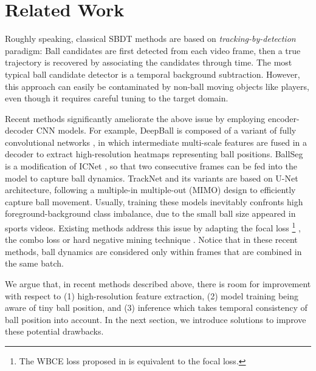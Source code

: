 \documentclass{bmvc2k}
\begin{document}
\section{Related Work}
\label{sec:related}
Roughly speaking, classical SBDT methods
\cite{lepetit+2003cvpr,yu+2003acmmm,yu+2003icme,yu+2003icme2,tong+2004icpr,yu+2004icip,zaveri+2004icme,desai+2005prmi,kittler+2005ia,liang+2005pcm,yan+2005bmvc,abed+2006acivs,chen+2006cesa,ren+2006eccvw,shimawaki+2006icpr,yu+2006tmm,chen+2007tst,chen+2007icassp,yu+2007icme,yu+2007avc,yu+2007vcip,ariki+2008icme,huang+2008icpr,pallavi+2008jvcir,yan+2008tpami,zhu+2008civr,beetz+2009ijcss,zhu+2009tmm,kim+2009cgiv,miura+2009cviu,wong+2010ics,teachabarikiti+2010icca,chakraborty+2011sic,chakraborty+2012icspcc,chakraborty+2013indicon,chakraborty+2013jo,zhou+2013icassp,yan+2014cvs,archana+2015pcs,lyu+2015icia,zhou+2015tmm,lyu+2017ijsr}
are based on {\it tracking-by-detection} paradigm:
Ball candidates are first detected from each video frame, then a true trajectory is recovered by associating the candidates through time.
The most typical ball candidate detector is a temporal background subtraction.
However, this approach can easily be contaminated by non-ball moving objects like players, even though it requires careful tuning to the target domain.
\par
Recent methods \cite{reno+2018cvprw,kamble+2018oer,voeikov+2020cvprw,komorowski+2020visapp,komorowski+2019visapp,komorowski+2019mva,zandycke+2019mmsports,wu+2020iet,ghasemzadeh+2021bmvc,huang+2019avss,sun+2020icpai,liu+2022cvprw} significantly ameliorate the above issue by employing encoder-decoder CNN models.
For example, DeepBall \cite{komorowski+2019visapp,komorowski+2019mva} is composed of a variant of fully convolutional networks \cite{liu+2016eccv}, in which intermediate multi-scale features are fused in a decoder to extract high-resolution heatmaps representing ball positions.
BallSeg \cite{zandycke+2019mmsports} is a modification of ICNet \cite{zhao+2018eccv}, so that two consecutive frames can be fed into the model to capture ball dynamics.
TrackNet and its variants \cite{huang+2019avss,sun+2020icpai,liu+2022cvprw} are based on U-Net \cite{ronneberger+2015miccai} architecture, following a multiple-in multiple-out (MIMO) design to efficiently capture ball movement.
Usually, training these models inevitably confronts high foreground-background class imbalance, due to the small ball size appeared in sports videos.
Existing methods address this issue by adapting the focal loss \footnote{The WBCE loss proposed in \cite{sun+2020icpai} is equivalent to the focal loss.} \cite{lin+2017iccv},
the combo loss \cite{taghanaki+cmig} or hard negative mining technique \cite{liu+2016eccv}.
Notice that in these recent methods, ball dynamics are considered only within frames that are combined in the same batch.
\par
We argue that, in recent methods described above, there is room for improvement with respect to (1) high-resolution feature extraction, (2) model training being aware of tiny ball position, and (3) inference which takes temporal consistency of ball position into account.
In the next section, we introduce solutions to improve these potential drawbacks.
\end{document}
